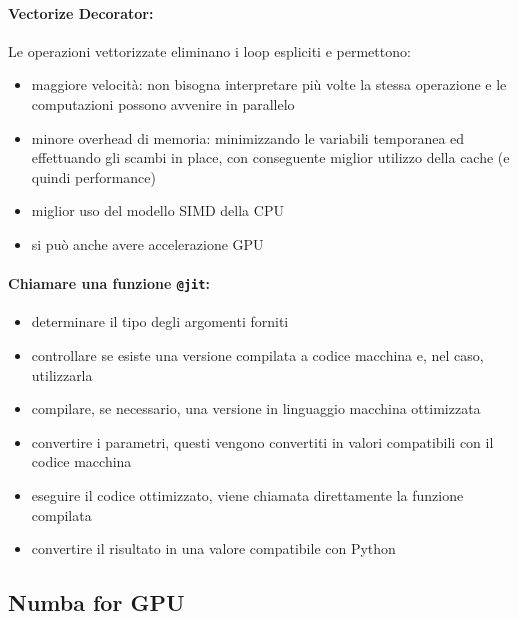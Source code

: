 \paragraph{Vectorize Decorator:} Le operazioni vettorizzate eliminano i loop espliciti e permettono: 
\begin{itemize}
	\item maggiore velocità: non bisogna interpretare più volte la stessa operazione e le computazioni possono avvenire in parallelo
	
	\item minore overhead di memoria: minimizzando le variabili temporanea ed effettuando gli scambi in place, con conseguente miglior utilizzo della cache (e quindi performance)
	
	\item miglior uso del modello SIMD della CPU
	
	\item si può anche avere accelerazione GPU
\end{itemize}

\paragraph{Chiamare una funzione \texttt{@jit}:} 
\begin{itemize}
	\item determinare il tipo degli argomenti forniti
	
	\item controllare se esiste una versione compilata a codice macchina e, nel caso, utilizzarla
	
	\item compilare, se necessario, una versione in linguaggio macchina ottimizzata
	
	\item convertire i parametri, questi vengono convertiti in valori compatibili con il codice macchina
	
	\item eseguire il codice ottimizzato, viene chiamata direttamente la funzione compilata
	
	\item convertire il risultato in una valore compatibile con Python
\end{itemize}

\subsection{Numba for GPU}

